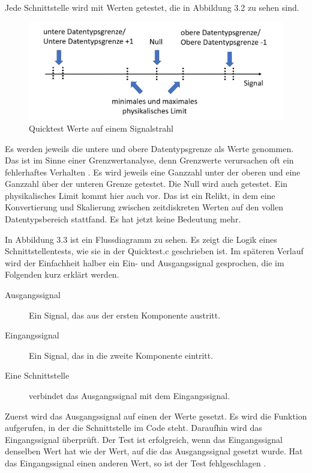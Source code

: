 Jede Schnittstelle wird mit Werten getestet, die in Abbildung 3.2 zu sehen sind.


\begin{figure}[h]
\centering
\includegraphics[scale=.9,]{Bilder/EquiZeitstrahl/QuicktestSignalstrahl.png}
\caption{Quicktest Werte auf einem Signalstrahl \cite[vgl.][]{quicktestc}}
\end{figure}
Es werden jeweils die untere und obere Datentypsgrenze als Werte genommen. Das ist im Sinne einer Grenzwertanalyse, denn
Grenzwerte verursachen oft ein fehlerhaftes Verhalten \cite[vgl.][S. 36]{integration}. 
Es wird jeweils eine Ganzzahl unter der oberen und eine Ganzzahl über der unteren Grenze getestet. Die Null wird auch getestet.
Ein physikalisches Limit kommt hier auch vor. Das ist ein Relikt, in dem eine Konvertierung und Skalierung zwischen zeitdiskreten Werten auf den vollen
Datentypsbereich stattfand. Es hat jetzt keine Bedeutung mehr.\par%

In Abbildung 3.3 ist ein Flussdiagramm zu sehen. Es zeigt die Logik eines Schnittstellentests, wie sie in der Quicktest.c 
geschrieben ist. 
Im späteren Verlauf wird der Einfachheit halber ein Ein- und Ausgangssignal gesprochen, die im Folgenden kurz erklärt werden.
\begin{description}
\item[Ausgangssignal] Ein Signal, das aus der ersten Komponente austritt.
\item[Eingangssignal] Ein Signal, das in die zweite Komponente eintritt.
\item[Eine Schnittstelle] verbindet das Ausgangssignal mit dem Eingangssignal.
\end{description}
Zuerst wird das Ausgangssignal auf einen der Werte gesetzt. Es wird die Funktion aufgerufen, in der
die Schnittstelle im Code steht. Daraufhin wird das Eingangssignal überprüft. Der Test ist erfolgreich, wenn 
das Eingangssignal denselben Wert hat wie der Wert, auf die das Ausgangssignal gesetzt wurde. Hat das Eingangssignal einen
anderen Wert, so ist der Test fehlgeschlagen \cite[vgl.][]{quicktestc}\cite[vgl.][]{quicktestlog}.

